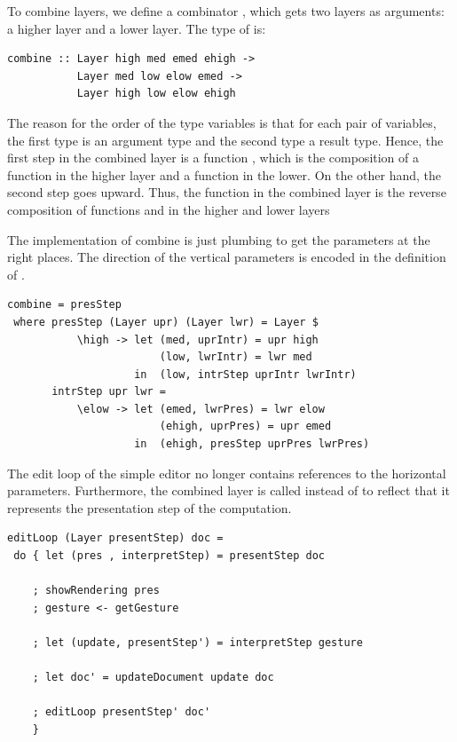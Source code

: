 \documentclass[preprint,natbib]{sigplanconf}
\begin{document}

To combine layers, we define a combinator , which gets two layers as arguments: a higher layer and a lower layer. The type of  is:

\begin{small}
\begin{verbatim}
combine :: Layer high med emed ehigh -> 
           Layer med low elow emed -> 
           Layer high low elow ehigh
\end{verbatim}
\end{small}

The reason for the order of the type variables is that for each pair of variables, the first type is an argument type and the second type  a result type. Hence, the first step in the combined layer is a function , which is the composition of a function  in the higher layer and a function  in the lower. On the other hand, the second step goes upward.  Thus, the function  in the combined layer is the reverse composition of functions  and  in the higher and lower layers
  
The implementation of combine is just plumbing to get the parameters at the right places. The direction of the vertical parameters is encoded in the definition of . 


\begin{small}
\begin{verbatim}
combine = presStep
 where presStep (Layer upr) (Layer lwr) = Layer $ 
           \high -> let (med, uprIntr) = upr high
                        (low, lwrIntr) = lwr med
                    in  (low, intrStep uprIntr lwrIntr)
       intrStep upr lwr = 
           \elow -> let (emed, lwrPres) = lwr elow
                        (ehigh, uprPres) = upr emed
                    in  (ehigh, presStep uprPres lwrPres)
\end{verbatim}%
\end{small}



The edit loop of the simple editor no longer contains references to the horizontal parameters. Furthermore, the combined layer is called  instead of  to reflect that it represents the presentation step of the computation.

\begin{small}
\begin{verbatim}
editLoop (Layer presentStep) doc = 
 do { let (pres , interpretStep) = presentStep doc
    
    ; showRendering pres
    ; gesture <- getGesture
    
    ; let (update, presentStep') = interpretStep gesture
    
    ; let doc' = updateDocument update doc
    
    ; editLoop presentStep' doc'
    }
\end{verbatim}
\end{small}
\end{document}
